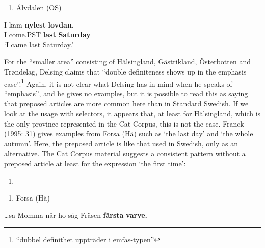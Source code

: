 \begin{enumerate} %
\item 
Älvdalen (OS)

\end{enumerate} %
\ea\label{}
\gll I  kam  \textbf{nylest} \textbf{lovdan.}\\


I  come.PST  \textbf{last} \textbf{Saturday}\\ %


‘I came last Saturday.’
\z


For the “smaller area” consisting of Hälsingland, Gästrikland, Österbotten and Trøndelag, Delsing claims that “double definiteness shows up in the emphasis case”.\footnote{ “dubbel definithet uppträder i emfas-typen” } Again, it is not clear what Delsing has in mind when he speaks of “emphasis”, and he gives no examples, but it is possible to read this as saying that preposed articles are more common here than in Standard Swedish. If we look at the usage with selectors, it appears that, at least for Hälsingland, which is the only province represented in the Cat Corpus, this is not the case. Franck (1995: 31) gives examples from Forsa (Hä) such as  ‘the last day’ and  ‘the whole autumn’.  Here, the preposed article is like that used in Swedish, only as an alternative. The Cat Corpus material suggests a consistent pattern without a preposed article at least for the expression ‘the first time’:

\begin{enumerate} %
\item 
\end{enumerate} %
\setcounter{listLFOxcviiileveli}{0}
\begin{enumerate} %
\item 
Forsa (Hä)

\end{enumerate} %
\ea\label{}
\gll …sa  Momma  når  ho  såg  Fräsen  \textbf{fårsta} \textbf{varve.}\\


